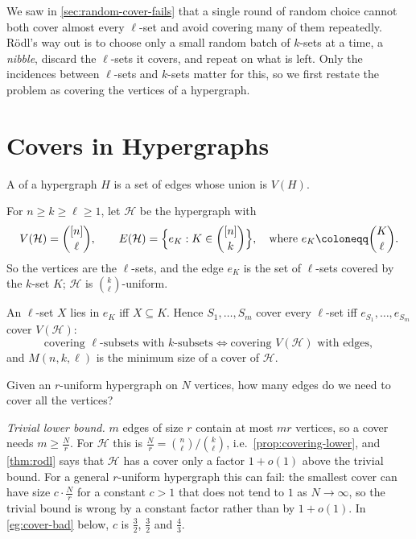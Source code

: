 
We saw in \autoref{sec:random-cover-fails} that a single round of random choice cannot both cover almost every \(\ell\)-set and avoid covering many of them repeatedly. R\"odl's way out is to choose only a small random batch of \(k\)-sets at a time, a \emph{nibble}, discard the \(\ell\)-sets it covers, and repeat on what is left. Only the incidences between \(\ell\)-sets and \(k\)-sets matter for this, so we first restate the problem as covering the vertices of a hypergraph.

\section{Covers in Hypergraphs}\label{sec:hypergraph-covers}

A  of a hypergraph \(H\) is a set of edges whose union is \(V(H)\).

\begin{definition}\label{def:aux-hypergraph}
    For \(n \ge k \ge \ell \ge 1\), let \(\mathcal{H}\) be the hypergraph with
    \[
        V(\mathcal{H}) = \binom{[n]}{\ell},
        \qquad
        E(\mathcal{H}) = \Bigl\{ e_K : K \in \binom{[n]}{k} \Bigr\},
        \quad\text{where } e_K \coloneqq \binom{K}{\ell}.
    \]
    So the vertices are the \(\ell\)-sets, and the edge \(e_K\) is the set of \(\ell\)-sets covered by the \(k\)-set \(K\); \(\mathcal{H}\) is \(\binom{k}{\ell}\)-uniform.
\end{definition}

An \(\ell\)-set \(X\) lies in \(e_K\) iff \(X \subseteq K\). Hence \(S_1, \ldots, S_m\) cover every \(\ell\)-set iff \(e_{S_1}, \ldots, e_{S_m}\) cover \(V(\mathcal{H})\):
\[
    \text{covering \(\ell\)-subsets with \(k\)-subsets} \iff \text{covering \(V(\mathcal{H})\) with edges},
\]
and \(M(n,k,\ell)\) is the minimum size of a cover of \(\mathcal{H}\).

\begin{question}\label{q:hypergraph-cover}
    Given an \(r\)-uniform hypergraph on \(N\) vertices, how many edges do we need to cover all the vertices?
\end{question}

\emph{Trivial lower bound.} \(m\) edges of size \(r\) contain at most \(mr\) vertices, so a cover needs \(m \ge \frac{N}{r}\). For \(\mathcal{H}\) this is \(\frac{N}{r} = \binom{n}{\ell} \big/ \binom{k}{\ell}\), i.e.\ \autoref{prop:covering-lower}, and \autoref{thm:rodl} says that \(\mathcal{H}\) has a cover only a factor \(1 + o(1)\) above the trivial bound. For a general \(r\)-uniform hypergraph this can fail: the smallest cover can have size \(c \cdot \frac{N}{r}\) for a constant \(c > 1\) that does not tend to \(1\) as \(N \to \infty\), so the trivial bound is wrong by a constant factor rather than by \(1 + o(1)\). In \autoref{eg:cover-bad} below, \(c\) is \(\frac{3}{2}\), \(\frac{3}{2}\) and \(\frac{4}{3}\).

